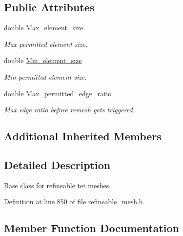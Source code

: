 \subsection*{Public Attributes}
\begin{DoxyCompactItemize}
\item 
double \hyperlink{classoomph_1_1RefineableTetMeshBase_ac123c6d33e2df7259fd0b604b7be1595}{Max\+\_\+element\+\_\+size}
\begin{DoxyCompactList}\small\item\em Max permitted element size. \end{DoxyCompactList}\item 
double \hyperlink{classoomph_1_1RefineableTetMeshBase_ad218437fae016c99b5b7a26e82f69a03}{Min\+\_\+element\+\_\+size}
\begin{DoxyCompactList}\small\item\em Min permitted element size. \end{DoxyCompactList}\item 
double \hyperlink{classoomph_1_1RefineableTetMeshBase_ae37561a28948852409a84dd5e8fe068e}{Max\+\_\+permitted\+\_\+edge\+\_\+ratio}
\begin{DoxyCompactList}\small\item\em Max edge ratio before remesh gets triggered. \end{DoxyCompactList}\end{DoxyCompactItemize}
\subsection*{Additional Inherited Members}


\subsection{Detailed Description}
Base class for refineable tet meshes. 

Definition at line 850 of file refineable\+\_\+mesh.\+h.



\subsection{Member Function Documentation}
\mbox{\label{classoomph_1_1RefineableTetMeshBase_a32bd7424c47ada606aa3a5248f19771a}} 
